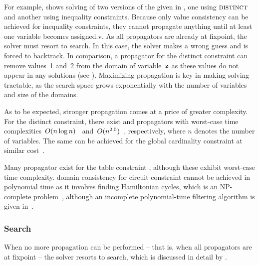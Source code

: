 %
For example,  shows solving of two versions
of the  given in , one
using $\mDistinct$ and another using inequality \glspl{constraint}.
%
Because only \gls{value consistency} can be achieved for inequality
\glspl{constraint}, they cannot propagate anything until at least one
\gls{variable} becomes \gls{assigned.v}.
%
As all \glspl{propagator} are already at \gls{fixpoint}, the \gls{solver} must
resort to \gls{search}.
%
In this case, the \gls{solver} makes a wrong guess and is forced to backtrack.
%
In comparison, a  \gls{propagator} for the
\gls{distinct constraint} can remove values~1 and~2 from the \gls{domain} of
\gls{variable}~$\mVar{z}$ as these values do not appear in any \glspl{solution}
(see ).
%
Maximizing \gls{propagation} is key in making solving tractable, as the
\gls{search space} grows exponentially with the number of \glspl{variable} and
size of the \glspl{domain}.

As to be expected, stronger propagation comes at a price of greater complexity.
%
For the \gls{distinct constraint}, there exist  and
 \glspl{propagator} with worst-case time
complexities~$O(n \log n)$~\cite{Lopez-OrtizEtAl:2003}
and~$O(n^{2.5})$~\cite{Regin:1994}, respectively, where $n$ denotes the
number of \glspl{variable}.
%
The same can be achieved for the \gls{global cardinality constraint} at similar
cost~\cite{QuimperEtAl:2005, Regin:1996}.

Many  \gls{propagator} exist for the \gls{table
  constraint} \cite{LecoutreSzymanek:2006, Lecoutre:2011, MairyEtAl:2014,
  PerezRegin:2014, LecoutreEtAl:2015, DemeulenaereEtAl:2016}, although these
exhibit worst-case time complexity.
%
\Gls{domain consistency} for \gls{circuit constraint} cannot be achieved in
polynomial time as it involves finding Hamiltonian cycles, which is an
NP-complete problem~\cite{GareyJohnson:1979}, although an incomplete
polynomial-time \gls{filtering algorithm} is given in~\cite{KayaHooker:2006}.



\subsubsection{Search}

When no more \gls{propagation} can be performed -- that is, when all
\glspl{propagator} are at \gls{fixpoint} -- the \gls{solver} resorts to
\gls{search}, which is discussed in detail by \textcite{VanBeek:2006}.

